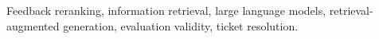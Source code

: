 \documentclass{ieeeaccess}
\begin{document}
\begin{keywords}
Feedback reranking, information retrieval, large language models,
retrieval-augmented generation, evaluation validity, ticket resolution.
\end{keywords}

\titlepgskip=-21pt

\maketitle
\end{document}
